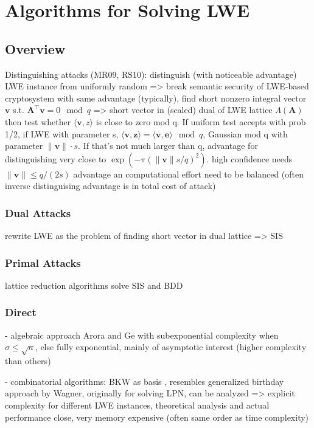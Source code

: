 \section{Algorithms for Solving LWE}
\subsection{Overview}
Distinguishing attacks (MR09, RS10): distinguish (with noticeable advantage) LWE instance from uniformly random => break semantic security of LWE-based cryptosystem with same advantage (typically), find short nonzero integral vector $\mathbf{v}$ s.t. $\mathbf{A}^\intercal \mathbf{v} = 0 \mod q$ => short vector in (scaled) dual of LWE lattice $\Lambda(\mathbf{A})$ %
then test whether $\langle \mathbf{v}, z \rangle$ is close to zero mod q. If uniform test accepts with prob 1/2, if LWE with parameter s, $\langle \mathbf{v}, \mathbf{z} \rangle = \langle \mathbf{v}, \mathbf{e} \rangle \mod q$, Gaussian mod q with parameter $\| \mathbf{v} \| \cdot s$. If that's not much larger than q, advantage for distinguishing very close to $\exp(-\pi (\| \mathbf{v} \| s/q)^2)$. high confidence needs $\| \mathbf{v} \| \leq q/(2s)$ 
advantage an computational effort need to be balanced (often inverse distinguising advantage is in total cost of attack)

\subsubsection{Dual Attacks}
rewrite LWE as the problem of finding short vector in dual lattice => SIS
\subsubsection{Primal Attacks}

lattice reduction algorithms solve SIS and BDD 


\subsubsection{Direct} %

- algebraic approach Arora and Ge with subexponential complexity when $\sigma \leq \sqrt{n}$, else fully exponential, mainly of asymptotic interest (higher complexity than others)


- combinatorial algorithms: BKW as basis \cite{BKW03}, resembles generalized birthday approach by Wagner, %
originally for solving LPN, can be analyzed => explicit complexity for different LWE instances, theoretical analysis and actual performance close,
very memory expensive (often same order as time complexity) 



